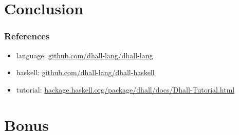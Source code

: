 \documentclass{beamer}
\begin{document}
 \section{Conclusion}

 \begin{frame}
   \frametitle{References}
   \begin{itemize}
   \item language: \url{github.com/dhall-lang/dhall-lang}
   \item haskell: \url{github.com/dhall-lang/dhall-haskell}
   \item tutorial: \url{hackage.haskell.org/package/dhall/docs/Dhall-Tutorial.html}
   \end{itemize}
 \end{frame}

\appendix{}

\section*{Bonus}\label{sec:bonus}
\end{document}
